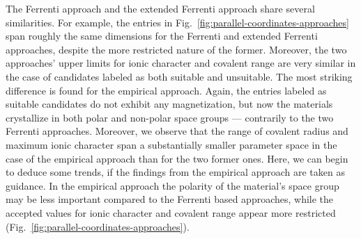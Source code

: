 \documentclass[superscriptaddress,unsortedaddress,
 amsmath,amssymb,
 aps,
]{revtex4-2}
\begin{document}
The Ferrenti approach and the extended Ferrenti approach share several similarities. For example, the entries in  Fig.~\ref{fig:parallel-coordinates-approaches} span roughly the same dimensions for the Ferrenti and extended Ferrenti approaches, despite the more restricted nature of the former.  
Moreover, the two approaches' upper limits for ionic character and covalent range are very similar in the case of candidates labeled as both suitable and unsuitable.   
The most striking difference is found for the empirical approach. Again, the entries labeled as suitable candidates do not exhibit any magnetization, but now the materials crystallize in both polar and non-polar space groups --- contrarily to the two Ferrenti approaches. Moreover, we observe that the range of covalent radius and maximum ionic character span a substantially smaller parameter space in the case of the empirical approach than for the two former ones.  
Here, we can begin to deduce some trends, if the findings from the empirical approach are taken as guidance. In the empirical approach the polarity of the material's space group may be less important compared to the Ferrenti based approaches, while the accepted values for ionic character and covalent range appear more restricted (Fig.~\ref{fig:parallel-coordinates-approaches}). 
\end{document}
